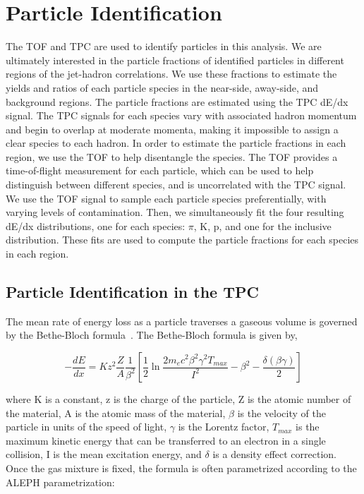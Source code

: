 \section{Particle Identification}

The TOF and TPC are used to identify particles in this analysis. We are ultimately interested in the particle fractions of identified particles in different regions of the jet-hadron correlations. We use these fractions to estimate the yields and ratios of each particle species in the near-side, away-side, and background regions. The particle fractions are estimated using the TPC dE/dx signal. The TPC signals for each species vary with associated hadron momentum and begin to overlap at moderate momenta, making it impossible to assign a clear species to each hadron. In order to estimate the particle fractions in each region, we use the TOF to help disentangle the species. The TOF provides a time-of-flight measurement for each particle, which can be used to help distinguish between different species, and is uncorrelated with the TPC signal. We use the TOF signal to sample each particle species preferentially, with varying levels of contamination. Then, we simultaneously fit the four resulting dE/dx distributions, one for each species: $\pi$, K, p, and one for the inclusive distribution. These fits are used to compute the particle fractions for each species in each region.

\subsection*{Particle Identification in the TPC}

The mean rate of energy loss as a particle traverses a gaseous volume is governed by the Bethe-Bloch formula~\cite{PDG}. The Bethe-Bloch formula is given by, 

\begin{equation}
    -\frac{dE}{dx} = K z^2 \frac{Z}{A} \frac{1}{\beta^2} \left[\frac{1}{2} \ln \frac{2 m_e c^2 \beta^2 \gamma^2 T_{max}}{I^2} - \beta^2 - \frac{\delta(\beta\gamma)}{2}\right]
\end{equation}

\noindent where K is a constant, z is the charge of the particle, Z is the atomic number of the material, A is the atomic mass of the material, $\beta$ is the velocity of the particle in units of the speed of light, $\gamma$ is the Lorentz factor, $T_{max}$ is the maximum kinetic energy that can be transferred to an electron in a single collision, I is the mean excitation energy, and $\delta$ is a density effect correction. Once the gas mixture is fixed, the formula is often parametrized according to the ALEPH parametrization:

